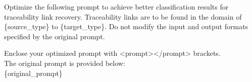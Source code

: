 Optimize the following prompt to achieve better classification results for traceability link recovery.
Traceability links are to be found in the domain of \{source\_type\} to \{target\_type\}.
Do not modify the input and output formats specified by the original prompt.

Enclose your optimized prompt with <prompt></prompt> brackets.\\

The original prompt is provided below:\\
\tripplequote\{original\_prompt\}\tripplequote